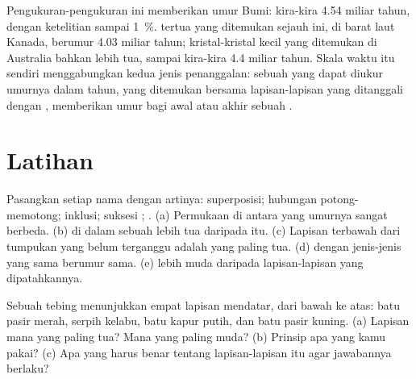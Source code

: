 Pengukuran-pengukuran ini memberikan umur Bumi: kira-kira \num{4.54} miliar
tahun, dengan ketelitian sampai 1~\%.  tertua yang ditemukan sejauh
ini, di barat laut Kanada, berumur \num{4.03} miliar tahun; kristal-kristal
kecil yang ditemukan di Australia bahkan lebih tua, sampai kira-kira
\num{4.4} miliar tahun. Skala waktu itu sendiri menggabungkan kedua jenis
penanggalan: sebuah  yang dapat diukur umurnya dalam tahun, yang
ditemukan bersama lapisan-lapisan yang ditanggali dengan ,
memberikan umur bagi awal atau akhir sebuah .

\section{Latihan}

\begin{exercise}[$\star$]\label{exo:g7:geological-time:1}
Pasangkan setiap nama dengan artinya: superposisi; hubungan
potong-memotong; inklusi; suksesi ; . (a) Permukaan
 di antara  yang umurnya sangat berbeda. (b)  di
dalam sebuah  lebih tua daripada  itu. (c) Lapisan terbawah
dari tumpukan yang belum terganggu adalah yang paling tua. (d) 
dengan jenis-jenis  yang sama berumur sama. (e)  lebih muda
daripada lapisan-lapisan yang dipatahkannya.
\end{exercise}

\begin{exercise}[$\star$]\label{exo:g7:geological-time:2}
Sebuah tebing menunjukkan empat lapisan mendatar, dari bawah ke atas: batu
pasir merah, serpih kelabu, batu kapur putih, dan batu pasir kuning.
(a) Lapisan mana yang paling tua? Mana yang paling muda? (b) Prinsip apa
yang kamu pakai? (c) Apa yang harus benar tentang lapisan-lapisan itu agar
jawabannya berlaku?
\end{exercise}

